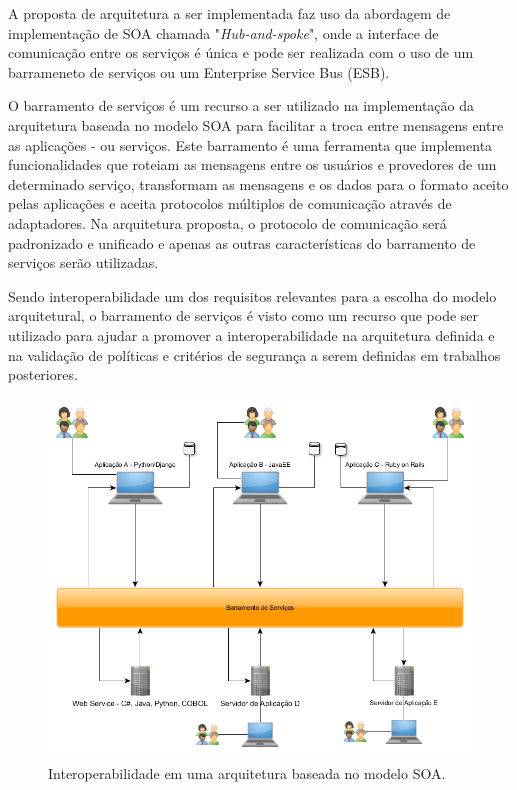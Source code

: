 A proposta de arquitetura a ser implementada faz uso da abordagem de implementação de SOA chamada "\textit{Hub-and-spoke}", onde a interface de comunicação entre os serviços é única e pode ser realizada com o uso de um barrameneto de serviços ou um Enterprise Service Bus (ESB).

O barramento de serviços é um recurso a ser utilizado na implementação da arquitetura baseada no modelo SOA para facilitar a troca entre mensagens entre as aplicações - ou serviços. Este barramento é uma ferramenta que implementa funcionalidades que roteiam as mensagens entre os usuários e provedores de um determinado serviço, transformam as mensagens e os dados para o formato aceito pelas aplicações e aceita protocolos múltiplos de comunicação através de adaptadores. Na arquitetura proposta, o protocolo de comunicação será padronizado e unificado e apenas as outras características do barramento de serviços serão utilizadas.

Sendo interoperabilidade um dos requisitos relevantes para a escolha do modelo arquitetural, o barramento de serviços é visto como um recurso que pode ser utilizado para ajudar a promover a interoperabilidade na arquitetura definida e na validação de políticas e critérios de segurança a serem definidas em trabalhos posteriores.

\begin{figure}[htb]
\centering
\includegraphics[width=1\textwidth]{figuras/barramento_interoperabilidade.PNG}
\caption{Interoperabilidade em uma arquitetura baseada no modelo SOA.}
\label{barramento_interoperabilidade}
\end{figure}

